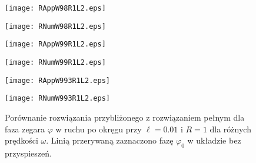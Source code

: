 \begin{figure}
\begin{minipage}[b]{.5\linewidth}
\centering
\texttt{[image: RAppW98R1L2.eps]}
\label{fig:3a1}
\end{minipage}%
\begin{minipage}[b]{.5\linewidth}
\centering
\texttt{[image: RNumW98R1L2.eps]}
\label{fig:3n1}
\end{minipage}
\begin{minipage}[b]{.5\linewidth}
\centering
\texttt{[image: RAppW99R1L2.eps]}
\label{fig:3a2}
\end{minipage}%
\begin{minipage}[b]{.5\linewidth}
\centering
\texttt{[image: RNumW99R1L2.eps]}
\label{fig:3n2}
\end{minipage}
\begin{minipage}[b]{.5\linewidth}
\centering
\texttt{[image: RAppW993R1L2.eps]}
\label{fig:3a3}
\end{minipage}%
\begin{minipage}[b]{.5\linewidth}
\centering
\texttt{[image: RNumW993R1L2.eps]}
\label{fig:3n3}
\end{minipage}
\caption{Porównanie rozwiązania przybliżonego z rozwiązaniem pełnym
dla faza zegara $\varphi$ w ruchu po okręgu przy
$\ell=0.01$ i $R=1$ dla różnych prędkości $\omega$. 
Linią przerywaną zaznaczono fazę 
$\varphi_0$ w układzie bez przyspieszeń.}\label{fig:3}
\end{figure}
\newpage
